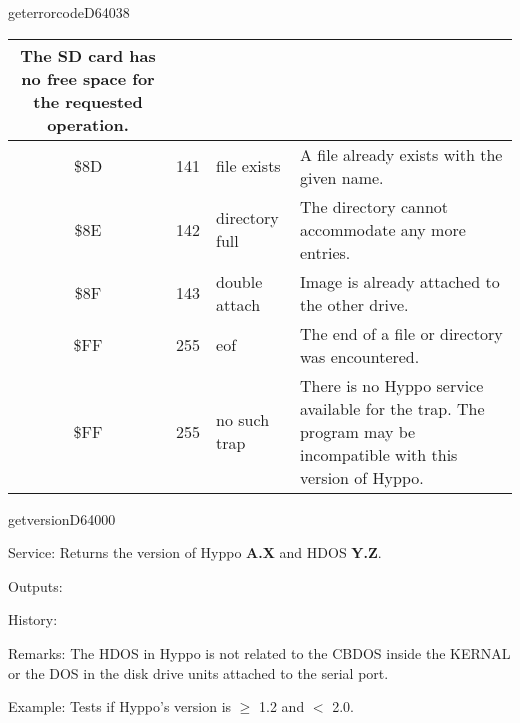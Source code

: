 \begin{hyppotrap}{geterrorcode}{D640}{38}
{\begin{longtable}{|c|r|l|p{8cm}|}
    The SD card has no free space for the requested operation.
    \\\hline
    \index{Hyppo Error Codes!\$8D}
    \$8D & 141 & file exists &
    A file already exists with the given name.
    \\\hline
    \index{Hyppo Error Codes!\$8E}
    \$8E & 142 & directory full &
    The directory cannot accommodate any more entries.
    \\\hline
    \index{Hyppo Error Codes!\$8F}
    \$8F & 143 & double attach &
    Image is already attached to the other drive.
    \\\hline
    \index{Hyppo Error Codes!\$FF}
    \$FF & 255 & eof &
    The end of a file or directory was encountered.
    \\\hline
    \index{Hyppo Error Codes!\$FF}
    \$FF & 255 & no such trap &
    There is no Hyppo service available for the trap. The program may be
    incompatible with this version of Hyppo.
    \\\hline
  \end{longtable}
}
\end{hyppotrap}


\newpage
\begin{hyppotrap}{getversion}{D640}{00}
\item [Service:]
  Returns the version of Hyppo \textbf{A.X} and HDOS \textbf{Y.Z}.
\item [Outputs:]
\item [History:]
\item [Remarks:]
  The HDOS in Hyppo is not related to the CBDOS inside the KERNAL or the
  DOS in the disk drive units attached to the serial port.
\item [Example:]
  Tests if Hyppo's version is $\geq$ 1.2 and $<$ 2.0.
\end{hyppotrap}


